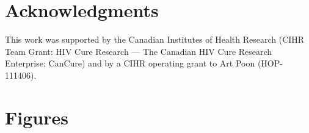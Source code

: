 \documentclass[12pt]{article}
\begin{document}

\section * {Acknowledgments} \label{sec:ackn}
This work was supported by the Canadian Institutes of Health Research (CIHR Team Grant: HIV Cure Research --- The Canadian HIV Cure Research Enterprise; CanCure) and by a CIHR operating grant to Art Poon (HOP-111406).

\clearpage





\clearpage


\section * {Figures}
\end{document}
